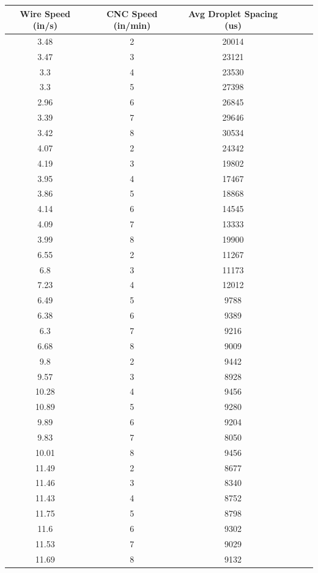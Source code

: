 \documentclass[12pt]{article}
\begin{document}
\begin{center}
\begin{tabular}{ |c|c|c|c|c|c| }
  
\end{tabular}



\end{center}


\clearpage


\begin{center}

\begin{tabular}{ |c|c|c|c|c|c| }


  \hline
  \textbf{Wire Speed (in/s)} & \textbf{CNC Speed (in/min)} & \textbf{Avg Droplet Spacing (us)} \\ \hline
3.48 &	2 &	20014 \\ \hline
3.47 &	3 &	23121 \\ \hline
3.3 &	4 &	23530 \\ \hline
3.3 &	5 &	27398 \\ \hline
2.96 &	6 &	26845 \\ \hline
3.39 &	7 &	29646 \\ \hline
3.42 &	8 &	30534 \\ \hline \hline
4.07 &	2 &	24342 \\ \hline
4.19 &	3 &	19802 \\ \hline
3.95 &	4 &	17467 \\ \hline
3.86 &	5 &	18868 \\ \hline
4.14 &	6 &	14545 \\ \hline
4.09 &	7 &	13333 \\ \hline
3.99 &	8 &	19900 \\ \hline \hline
6.55 &	2 &	11267 \\ \hline
6.8 &	3 &	11173 \\ \hline
7.23 &	4 &	12012 \\ \hline
6.49 &	5 &	9788 \\ \hline
6.38 &	6 &	9389 \\ \hline
6.3 &	7 &	9216 \\ \hline
6.68 &	8 &	9009 \\ \hline \hline
9.8 &	2 &	9442 \\ \hline
9.57 &	3 &	8928 \\ \hline
10.28 &	4 &	9456\\ \hline
10.89 &	5 &	9280 \\ \hline
9.89 &	6 &	9204 \\ \hline
9.83 &	7 &	8050 \\ \hline
10.01 &	8 &	9456 \\ \hline \hline
11.49 &	2 &	8677 \\ \hline
11.46 &	3 &	8340 \\ \hline
11.43 &	4 &	8752 \\ \hline
11.75 &	5 &	8798 \\ \hline
11.6 &	6 &	9302 \\ \hline
11.53 &	7 &	9029 \\ \hline
11.69 &	8 &	9132 \\ \hline 





\end{tabular}
\end{center}
\end{document}
